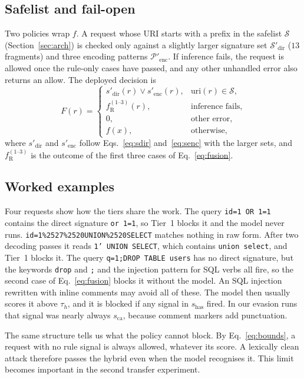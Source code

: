 \documentclass[preprint,11pt]{elsarticle}
\begin{document}
\subsection{Safelist and fail-open}
Two policies wrap $f$. A request whose URI starts with a prefix in the
safelist $\mathcal{S}$ (Section~\ref{sec:arch}) is checked only against a
slightly larger signature set $\mathcal{S}'_{\text{dir}}$ ($13$ fragments)
and three encoding patterns $\mathcal{P}'_{\text{enc}}$. If inference
fails, the request is allowed once the rule-only cases have passed, and any
other unhandled error also returns an allow. The deployed decision is
\begin{equation}
F(r)=
\begin{cases}
s'_{\text{dir}}(r)\vee s'_{\text{enc}}(r), & \mathrm{uri}(r)\in\mathcal{S},\\
f_{\text{R}}^{(1\text{--}3)}(r), & \text{inference fails},\\
0, & \text{other error},\\
f(x), & \text{otherwise},
\end{cases}
\label{eq:deployed}
\end{equation}
where $s'_{\text{dir}}$ and $s'_{\text{enc}}$ follow
Eqs.~\eqref{eq:sdir} and~\eqref{eq:senc} with the larger sets, and
$f_{\text{R}}^{(1\text{--}3)}$ is the outcome of the first three cases of
Eq.~\eqref{eq:fusion}.

\subsection{Worked examples}
Four requests show how the tiers share the work. The query
\texttt{id=1 OR 1=1} contains the direct signature \texttt{or 1=1}, so
Tier~1 blocks it and the model never runs.
\texttt{id=1\%2527\%2520UNION\%2520SELECT} matches nothing in raw form. After
two decoding passes it reads \texttt{1' UNION SELECT}, which contains
\texttt{union select}, and Tier~1 blocks it. The query
\texttt{q=1;DROP TABLE users} has no direct signature, but the keywords
\texttt{drop} and \texttt{;} and the injection pattern for SQL verbs all
fire, so the second case of Eq.~\eqref{eq:fusion} blocks it without the
model. An SQL injection rewritten with inline comments may avoid all of
these. The model then usually scores it above $\tau_h$, and it is blocked
if any signal in $s_{\text{has}}$ fired. In our evasion runs that signal
was nearly always $s_{\text{ca}}$, because comment markers add punctuation.

The same structure tells us what the policy cannot block. By
Eq.~\eqref{eq:bounds}, a request with no rule signal is always allowed,
whatever its score. A lexically clean attack therefore passes the hybrid
even when the model recognises it. This limit becomes important in the
second transfer experiment.
\end{document}
